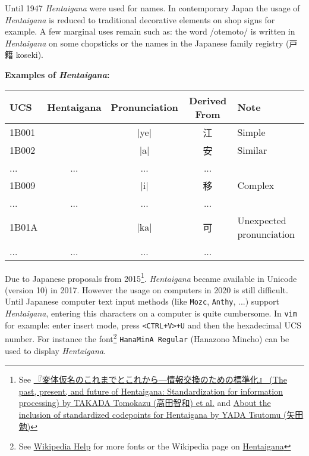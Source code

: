 Until 1947 \textit{Hentaigana} were used for names. In contemporary Japan the
usage of \textit{Hentaigana} is reduced to traditional decorative elements on
shop signs for example. A few marginal uses remain such as: the word /otemoto/
is written in \textit{Hentaigana} on some chopsticks or the names in the
Japanese family registry (戸籍 koseki).

\bigskip

\textbf{Examples of \textit{Hentaigana}:}

\begin{center}
\JapaneseFontN
\begin{tabular}{lcccl}
\textbf{UCS}&\textbf{Hentaigana}&\textbf{Pronunciation}&\textbf{Derived From}&\textbf{Note} \\\hline
1B001& 𛀁 & |ye|& 江  & Simple \\
1B002& 𛀂 & |a| & 安  & Similar \\
...  &... &...  &...  & \\
1B009& 𛀉   & |i|  & 移  & Complex \\
...  &... &...  &...  & \\
1B01A& 𛀚 &|ka| & 可  & Unexpected pronunciation \\
...  &... &...  &...  & \\
\end{tabular}
\JapaneseDefault
\end{center}

Due to Japanese proposals from 2015\footnote{See
\href{https://www.unicode.org/L2/L2015/15316-hentaigana-58_438.pdf}{『変体仮名のこれまでとこれから—情報交換のための標準化』
(The past, present, and future of Hentaigana: Standardization for information
processing) by TAKADA Tomokazu (高田智和) et al.} and
\href{https://www.unicode.org/L2/L2015/15318-hentaigana.pdf}{About the inclusion
of standardized codepoints for Hentaigana by YADA Tsutomu (矢田勉)} }.
\textit{Hentaigana} became available in Unicode (version 10) in 2017. However
the usage on computers in 2020 is still difficult. Until Japanese computer text
input methods (like \texttt{Mozc}, \texttt{Anthy}, ...) support
\textit{Hentaigana}, entering this characters on a computer is quite
cumbersome. In \texttt{vim} for example: enter insert mode, press
\texttt{<CTRL+V>+U} and then the hexadecimal UCS number. For instance the
font\footnote{See
\href{https://en.wikipedia.org/wiki/Help:Multilingual_support\#Hentaigana}{Wikipedia
Help} for more fonts or the Wikipedia page on
\href{https://en.wikipedia.org/wiki/Hentaigana}{Hentaigana} } \texttt{HanaMinA
Regular} (Hanazono Mincho) can be used to display \textit{Hentaigana}.
